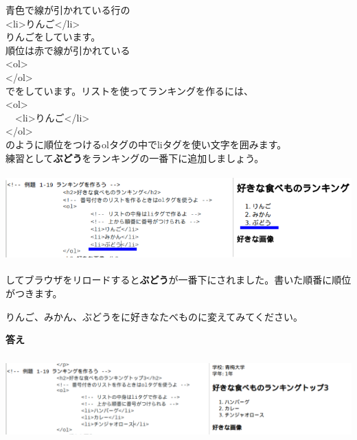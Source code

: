 \documentclass[a4paper,12pt]{jarticle}
\begin{document}
青色で線が引かれている行の\\
{\textless}li{\textgreater}りんご{\textless}/li{\textgreater}\\
りんごをしています。\\
順位は赤で線が引かれている\\
{\textless}ol{\textgreater}\\
{\textless}/ol{\textgreater}\\
でをしています。リストを使ってランキングを作るには、\\
{\textless}ol{\textgreater}\\
\ \ {\textless}li{\textgreater}りんご{\textless}/li{\textgreater}\\
{\textless}/ol{\textgreater}\\
のように順位をつけるolタグの中でliタグを使い文字を囲みます。\\
練習として\textbf{ぶどう}をランキングの一番下に追加しましょう。\\


\bigskip


\includegraphics[width=15cm,height=3.327cm]{textbook-img183.png}


\bigskip


してブラウザをリロードすると\textbf{ぶどう}が一番下にされました。書いた順番に順位がつきます。

りんご、みかん、ぶどうをに好きなたべものに変えてみてください。


\bigskip
\clearpage
\textbf{答え}


\bigskip



\includegraphics[width=15.905cm,height=3.3cm]{textbook-img184.png}


\bigskip
\end{document}
